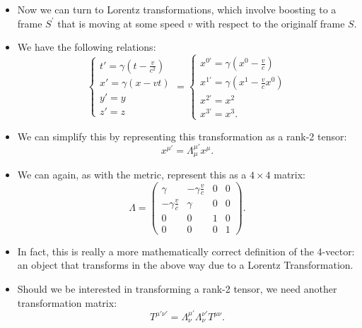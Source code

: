\begin{itemize}
    \item Now we can turn to Lorentz transformations, which involve boosting to a frame $S^{\prime}$ that is moving at some speed $v$ with respect to the originalf frame $S$.
    \item We have the following relations:
        \begin{equation}
            \begin{cases}
                t' = \gamma\left(t - \frac{v}{c^2}\right) \\
                x' = \gamma(x - vt) \\
                y' = y \\
                z' = z
            \end{cases}
            =
            \begin{cases}
                x^{0\prime} = \gamma\left(x^0 - \frac{v}{c} \right) \\
                x^{1\prime} = \gamma\left(x^1 - \frac{v}{c}x^0\right) \\
                x^{2\prime} = x^2 \\
                x^{3\prime} = x^3.
            \end{cases}
        \end{equation}
    \item We can simplify this by representing this transformation as a rank-2 tensor:
        \begin{equation}
            x^{\mu\prime} = \Lambda^{\mu\prime}_{\mu} x^{\mu}.
        \end{equation}
    \item We can again, as with the metric, represent this as a $4\times4$ matrix:
        \begin{equation}
            \Lambda = 
            \begin{pmatrix}
                \gamma & -\gamma \frac{v}{c} & 0 & 0 \\ 
                -\gamma \frac{v}{c} & \gamma & 0 & 0 \\ 
                0 & 0 & 1 & 0 \\
                0 & 0 & 0 & 1
            \end{pmatrix}.
        \end{equation}
    \item In fact, this is really a more mathematically correct definition of the 4-vector: an object that transforms in the above way due to a Lorentz Transformation.
    \item Should we be interested in transforming a rank-2 tensor, we need another transformation matrix:
        \begin{equation}
            T^{\mu\prime \nu\prime} = \Lambda^{\mu\prime}_{\nu}\Lambda^{\nu\prime}_{\nu} T^{\mu\nu}.
        \end{equation}
\end{itemize}




